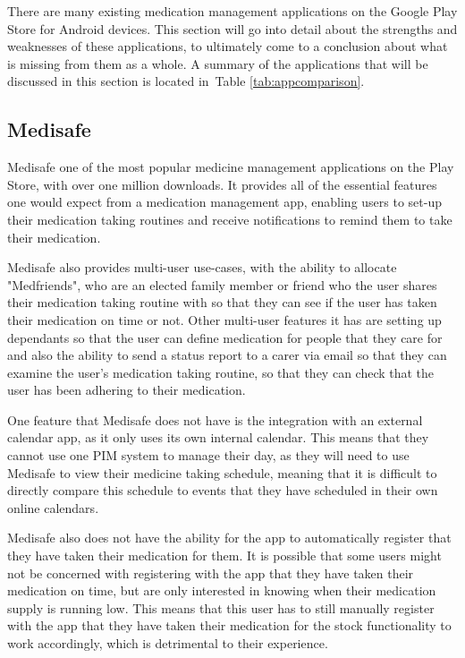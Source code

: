 \documentclass{l4proj}
\begin{document}
There are many existing medication management applications on the Google Play Store for Android devices. This section will go into detail about the strengths and weaknesses of these applications, to ultimately come to a conclusion about what is missing from them as a whole. A summary of the applications that will be discussed in this section is located in~Table \ref{tab:appcomparison}.

\subsection{Medisafe}

Medisafe one of the most popular medicine management applications on the Play Store, with over one million downloads. It provides all of the essential features one would expect from a medication management app, enabling users to set-up their medication taking routines and receive notifications to remind them to take their medication.

Medisafe also provides multi-user use-cases, with the ability to allocate "Medfriends", who are an elected family member or friend who the user shares their medication taking routine with so that they can see if the user has taken their medication on time or not. Other multi-user features it has are setting up dependants so that the user can define medication for people that they care for and also the ability to send a status report to a carer via email so that they can examine the user's medication taking routine, so that they can check that the user has been adhering to their medication.

One feature that Medisafe does not have is the integration with an external calendar app, as it only uses its own internal calendar. This means that they cannot use one PIM system to manage their day, as they will need to use Medisafe to view their medicine taking schedule, meaning that it is difficult to directly compare this schedule to events that they have scheduled in their own online calendars. 

Medisafe also does not have the ability for the app to automatically register that they have taken their medication for them. It is possible that some users might not be concerned with registering with the app that they have taken their medication on time, but are only interested in knowing when their medication supply is running low. This means that this user has to still manually register with the app that they have taken their medication for the stock functionality to work accordingly, which is detrimental to their experience. 
\end{document}
